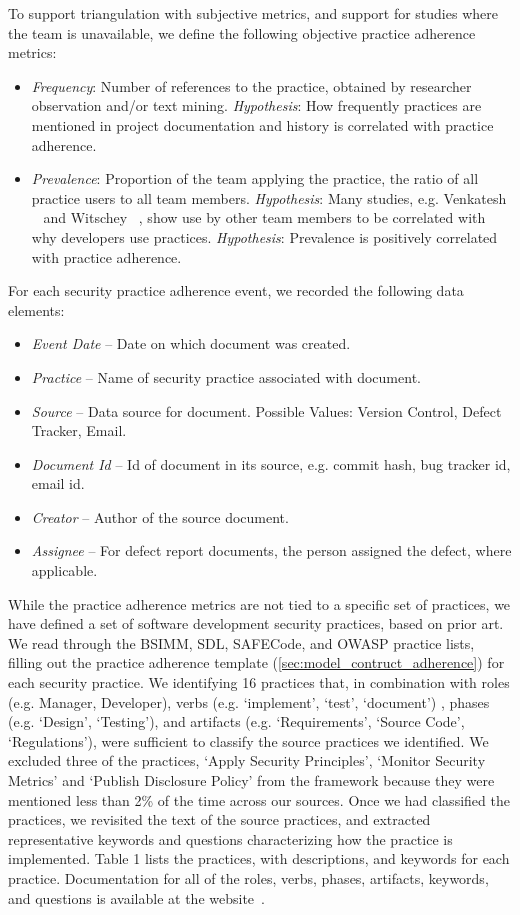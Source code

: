 To support triangulation with subjective metrics, and support for studies where the team is unavailable, we define the following objective practice adherence metrics:
\begin{itemize}
\item \textit{Frequency}: Number of references to the practice, obtained by researcher observation and/or text mining. \textit{Hypothesis}:  How frequently practices are mentioned in project documentation and history is correlated with practice adherence.
\item \textit{Prevalence}: Proportion of the team applying the practice, the ratio of all practice users to all team members. \textit{Hypothesis}: Many studies, e.g. Venkatesh ~\cite{venkatesh2003user} and Witschey ~\cite{witschey2015quantifying}, show use by other team members to be correlated with why developers use practices. \textit{Hypothesis}: Prevalence is positively correlated with practice adherence.
\end{itemize}
For each security practice adherence event, we recorded the following data elements:
\begin{itemize}
\item \textit{Event Date} – Date on which document was created.
\item \textit{Practice} – Name of security practice associated with document. 
\item \textit{Source} – Data source for document. Possible Values: Version Control, Defect Tracker, Email.
\item \textit{Document Id} – Id of document in its source, e.g. commit hash, bug tracker id, email id.
\item \textit{Creator} – Author of the source document.
\item \textit{Assignee} – For defect report documents, the person assigned the defect, where applicable.
\end{itemize}

While the practice adherence metrics are not tied to a specific set of practices, we have defined a set of software development security practices, based on prior art. We read through the BSIMM, SDL, SAFECode, and OWASP practice lists, filling out the practice adherence template (\ref{sec:model_contruct_adherence}) for each security practice. We identifying 16 practices that, in combination with roles (e.g. Manager, Developer), verbs (e.g. ‘implement’, ‘test’, ‘document’) , phases (e.g. ‘Design’, ‘Testing’), and artifacts (e.g. ‘Requirements’, ‘Source Code’, ‘Regulations’), were sufficient to classify the source practices we identified. We excluded three of the practices, ‘Apply Security Principles’,  ‘Monitor Security Metrics’ and ‘Publish Disclosure Policy’ from the framework because they were mentioned less than 2\% of the time across our sources.
Once we had classified the practices, we revisited the text of the source practices, and extracted representative keywords and questions characterizing how the practice is implemented. 
 Table 1 lists the practices, with descriptions, and keywords for each practice. Documentation for all of the roles, verbs, phases, artifacts, keywords, and questions is available at the website~\cite{morrison2016spefsite}.

